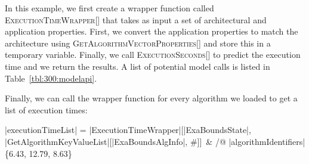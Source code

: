 In this example, we first create a wrapper function called \textsc{ExecutionTimeWrapper[]} that takes as input a set of architectural and application properties. First, we convert the application properties to match the architecture using \textsc{GetAlgorithmVectorProperties[]} and store this in a temporary variable. Finally, we call \textsc{ExecutionSeconds[]} to predict the execution time and we return the results. A list of potential model calls is listed in Table~\ref{tbl:300:modelapi}.

Finally, we can call the wrapper function for every algorithm we loaded to get a list of execution times:
\begin{mma}
  \In |executionTimeList| =  |ExecutionTimeWrapper|[|ExaBoundsState|, \linebreak |GetAlgorithmKeyValueList|[|ExaBoundsAlgInfo|, \#]]~\& /@ \linebreak |algorithmIdentifiers| \\
  \Out \{6.43, 12.79, 8.63\} \\
\end{mma}

